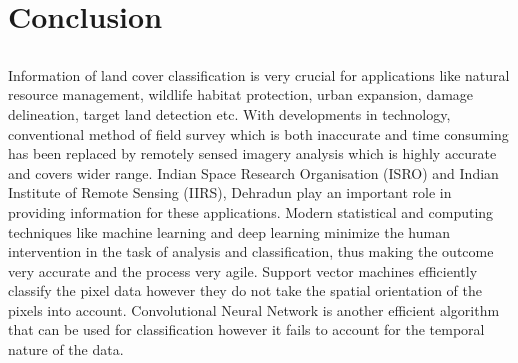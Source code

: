 \documentclass[12pt, a4paper]{report}
\begin{document}
\chapter{Conclusion}
\section{}

\paragraph{}
Information of land cover classification is very crucial for applications like natural resource management, wildlife habitat protection, urban expansion, damage delineation, target land detection etc. With developments in technology, conventional method of field survey which is both inaccurate and time consuming has been replaced by remotely sensed imagery analysis which is highly accurate and covers wider range. Indian Space Research Organisation (ISRO) and Indian Institute of Remote Sensing (IIRS), Dehradun play an important role in providing information for these applications. Modern statistical and computing techniques like machine learning and deep learning minimize the human intervention in the task of analysis and classification, thus making the outcome very accurate and the process very agile. Support vector machines efficiently classify the pixel data however they do not take the spatial orientation of the pixels into account. Convolutional Neural Network is another efficient algorithm that can be used for classification however it fails to account for the temporal nature of the data.

\printbibliography[heading=bibintoc, title={References}]
\end{document}

